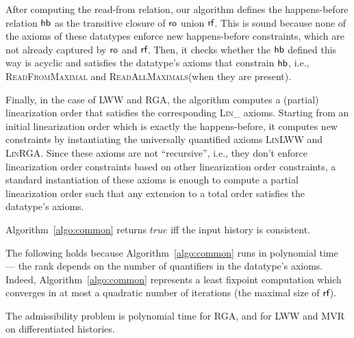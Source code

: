 After computing the read-from relation, our algorithm defines the happens-before relation $\textsf{hb}$ as the transitive closure of $\mathsf{ro}$ union $\textsf{rf}$. This is sound because none of the axioms of these datatypes enforce new happens-before constraints, which are not already captured by $\mathsf{ro}$ and $\textsf{rf}$. Then, it checks whether the $\textsf{hb}$ defined this way is acyclic and satisfies the datatype's axioms that constrain $\textsf{hb}$, i.e., \textsc{ReadFromMaximal} and \textsc{ReadAllMaximals}(when they are present).

Finally, in the case of LWW and RGA, the algorithm computes a (partial) linearization order that satisfies the corresponding \textsc{Lin\_} axioms. Starting from an initial linearization order which is exactly the happens-before, it computes new constraints by instantiating the universally quantified axioms \textsc{LinLWW} and \textsc{LinRGA}. Since these axioms are not ``recursive'', i.e., they don't enforce linearization order constraints based on other linearization order constraints, a standard instantiation of these axioms is enough to compute a partial linearization order such that any extension to a total order satisfies the datatype's axioms.

\vspace{-1.5mm}
\begin{theorem}

  Algorithm~\ref{algo:common} returns $\mathit{true}$ iff the input history is consistent.

\vspace{-1.5mm}
\end{theorem}

The following holds because Algorithm~\ref{algo:common} runs in polynomial time — the rank depends on the number of quantifiers in the datatype's axioms. Indeed, Algorithm~\ref{algo:common} represents a least fixpoint computation which converges in at most a quadratic number of iterations (the maximal size of $\textsf{rf}$).

\vspace{-1.5mm}
\begin{corollary}

  The admissibility problem is polynomial time for RGA, and for LWW and MVR on differentiated histories.

\vspace{-1.5mm}
\end{corollary}

